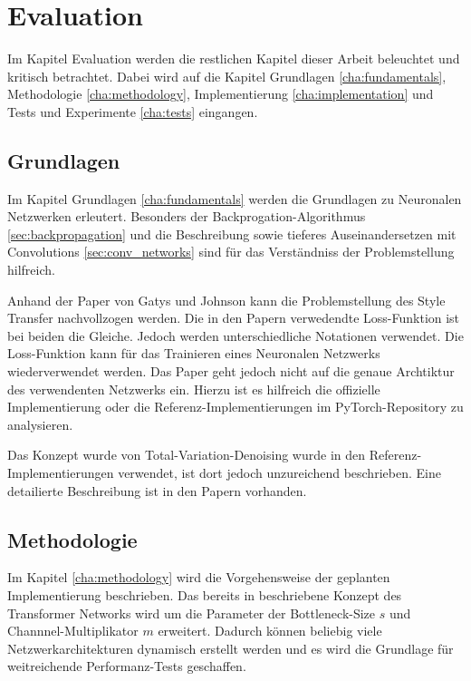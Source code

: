 \chapter{Evaluation}

Im Kapitel Evaluation werden die restlichen Kapitel dieser Arbeit beleuchtet und kritisch betrachtet. Dabei wird auf die Kapitel Grundlagen \ref{cha:fundamentals}, Methodologie \ref{cha:methodology}, Implementierung \ref{cha:implementation} und Tests und Experimente \ref{cha:tests} eingangen.

\section{Grundlagen}

Im Kapitel Grundlagen \ref{cha:fundamentals} werden die Grundlagen zu Neuronalen Netzwerken erleutert. Besonders der Backprogation-Algorithmus \ref{sec:backpropagation} und die Beschreibung sowie tieferes Auseinandersetzen mit Convolutions \ref{sec:conv_networks} sind für das Verständniss der Problemstellung hilfreich.

Anhand der Paper von Gatys \cite{DBLP:journals/corr/GatysEB15a} und Johnson \cite{DBLP:journals/corr/JohnsonAL16} kann die Problemstellung des Style Transfer nachvollzogen werden. Die in den Papern verwedendte Loss-Funktion ist bei beiden die Gleiche. Jedoch werden unterschiedliche Notationen verwendet.
Die Loss-Funktion kann für das Trainieren eines Neuronalen Netzwerks wiederverwendet werden. Das Paper \cite{DBLP:journals/corr/JohnsonAL16} geht jedoch nicht auf die genaue Archtiktur des verwendenten Netzwerks ein. Hierzu ist es hilfreich die offizielle Implementierung \cite{Johnson2016} oder die Referenz-Implementierungen im PyTorch-Repository \cite{OnlineToturialNeuralStylePyTorch} zu analysieren.

Das Konzept wurde von Total-Variation-Denoising wurde in den Referenz-Implementierungen verwendet, ist dort jedoch unzureichend beschrieben. Eine detailierte Beschreibung ist in den Papern \cite{RUDIN1992259, DBLP:journals/corr/EstrelaMS16} vorhanden.

\section{Methodologie}

Im Kapitel \ref{cha:methodology} wird die Vorgehensweise der geplanten Implementierung beschrieben. Das bereits in \cite{DBLP:journals/corr/JohnsonAL16} beschriebene Konzept des Transformer Networks wird um die Parameter der Bottleneck-Size $ s $ und Channnel-Multiplikator $ m $ erweitert. Dadurch können beliebig viele Netzwerkarchitekturen dynamisch erstellt werden und es wird die Grundlage für weitreichende Performanz-Tests geschaffen.

